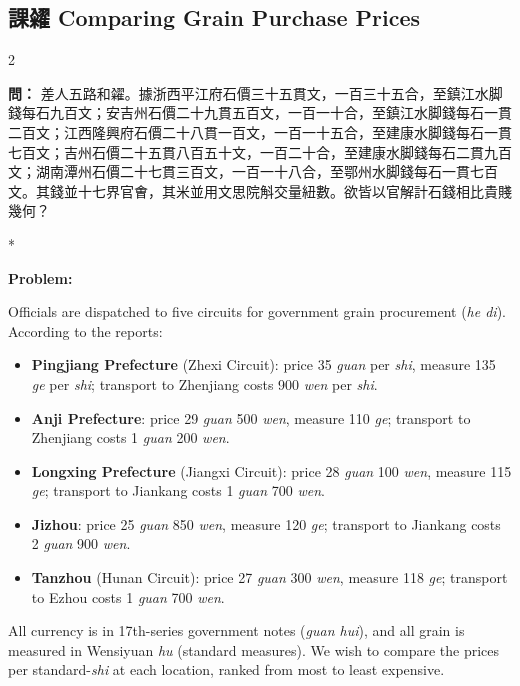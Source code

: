 \documentclass[11pt,a4paper]{article}
\newcommand{\CnQuestion}[1]{\par\noindent\textbf{\color{problemcolor}問：}#1\par\vspace{0.5ex}}
\newcommand{\EnQuestion}{\par\noindent\textbf{\color{problemcolor}Problem:}\par\vspace{0.5ex}}
\newcommand{\switchEn}{\switchcolumn[1]*}
\begin{document}
\vspace{1em}

\subsection*{課糴 \quad Comparing Grain Purchase Prices}

\begin{paracol}{2}

\CnQuestion{%
差人五路和糴。據浙西平江府石價三十五貫文，一百三十五合，至鎮江水脚錢每石九百文；安吉州石價二十九貫五百文，一百一十合，至鎮江水脚錢每石一貫二百文；江西隆興府石價二十八貫一百文，一百一十五合，至建康水脚錢每石一貫七百文；吉州石價二十五貫八百五十文，一百二十合，至建康水脚錢每石二貫九百文；湖南潭州石價二十七貫三百文，一百一十八合，至鄂州水脚錢每石一貫七百文。其錢並十七界官㑹，其米並用文思院斛交量紐數。欲皆以官解計石錢相比貴賤幾何？
}

\switchEn

\EnQuestion
Officials are dispatched to five circuits for government grain procurement (\textit{he di}). According to the reports:

\begin{itemize}[leftmargin=1em,itemsep=0.2ex]
\item \textbf{Pingjiang Prefecture} (Zhexi Circuit): price 35 \textit{guan} per \textit{shi}, measure 135 \textit{ge} per \textit{shi}; transport to Zhenjiang costs 900 \textit{wen} per \textit{shi}.
\item \textbf{Anji Prefecture}: price 29 \textit{guan} 500 \textit{wen}, measure 110 \textit{ge}; transport to Zhenjiang costs 1 \textit{guan} 200 \textit{wen}.
\item \textbf{Longxing Prefecture} (Jiangxi Circuit): price 28 \textit{guan} 100 \textit{wen}, measure 115 \textit{ge}; transport to Jiankang costs 1 \textit{guan} 700 \textit{wen}.
\item \textbf{Jizhou}: price 25 \textit{guan} 850 \textit{wen}, measure 120 \textit{ge}; transport to Jiankang costs 2 \textit{guan} 900 \textit{wen}.
\item \textbf{Tanzhou} (Hunan Circuit): price 27 \textit{guan} 300 \textit{wen}, measure 118 \textit{ge}; transport to Ezhou costs 1 \textit{guan} 700 \textit{wen}.
\end{itemize}

All currency is in 17th-series government notes (\textit{guan hui}), and all grain is measured in Wensiyuan \textit{hu} (standard measures). We wish to compare the prices per standard-\textit{shi} at each location, ranked from most to least expensive.


\end{paracol}
\end{document}
